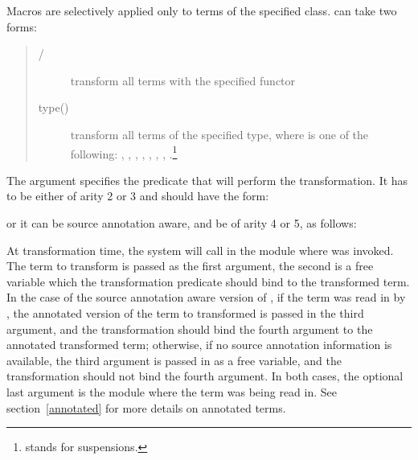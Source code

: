 Macros are selectively applied only to terms of the specified class.
 can take two forms:
\begin{quote}
\begin{description}

\item[/]
  transform all terms with the specified functor

\item[type()]
  transform all terms of the specified type, where 
  is one of the following: , ,
  ,
  , , , ,
  .\footnote{%
     stands for suspensions.}

\end{description}
\end{quote}
The  argument specifies the predicate that will
perform the
transformation. It has to be either of arity 2 or 3 and should have the form:
\begin{quote}
\end{quote}
or it can be source annotation aware, and be of arity 4 or 5, as follows:
\begin{quote}
\end{quote}
At transformation time, the system will call  in the module
where  was invoked.
The term to transform is passed as the first argument, the second is a free
variable which the transformation predicate should bind to the transformed
term. In the case of the source annotation aware version of ,
if
the term was read in by , the annotated version of
the
term to transformed is passed in the third argument, and the transformation
should bind the fourth argument to the annotated transformed term;
otherwise, if no source annotation information is available, the third
argument is passed in as a free variable, and the transformation should not
bind the fourth argument. In both  cases, the optional last
argument is the module where the term was being read in. See
section~\ref{annotated} for more details on annotated terms.

